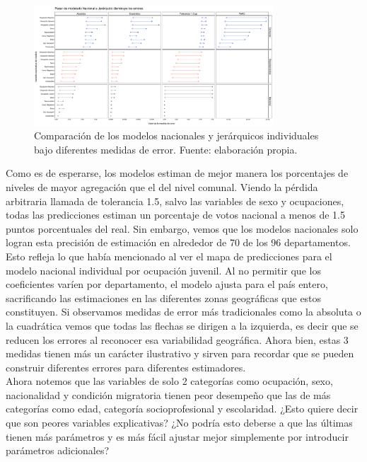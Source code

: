 \begin{figure}[h]
	\centering
	\includegraphics[width = 0.8\textwidth]{Figs/Modelado/Graf_Errores_Modelos_Individuales}
	\caption{Comparación de los modelos nacionales y jerárquicos individuales bajo diferentes medidas de error. Fuente: elaboración propia.}
	\label{fig:Errores_Modelos_Individuales}
\end{figure} 

Como es de esperarse, los modelos estiman de mejor manera los porcentajes de niveles de mayor agregación que el del nivel comunal. Viendo la pérdida arbitraria llamada de tolerancia 1.5, salvo las variables de sexo y ocupaciones, todas las predicciones estiman un porcentaje de votos nacional a menos de 1.5 puntos porcentuales del real. Sin embargo, vemos que los modelos nacionales solo logran esta precisión de estimación en alrededor de 70 de los 96 departamentos.\\ 

Esto refleja lo que había mencionado al ver el mapa de predicciones para el modelo nacional individual por ocupación juvenil. Al no permitir que los coeficientes varíen por departamento, el modelo ajusta para el país entero, sacrificando las estimaciones en las diferentes zonas geográficas que estos constituyen. Si observamos medidas de error más tradicionales como la absoluta o la cuadrática vemos que todas las flechas se dirigen a la izquierda, es decir que se reducen los errores al reconocer esa variabilidad geográfica. Ahora bien, estas 3 medidas tienen más un carácter ilustrativo y sirven para recordar que se pueden construir diferentes errores para diferentes estimadores.\\ 

Ahora notemos que las variables de solo 2 categorías como ocupación, sexo, nacionalidad y condición migratoria tienen peor desempeño que las de más categorías como edad, categoría socioprofesional y escolaridad. ¿Esto quiere decir que son peores variables explicativas? ¿No podría esto deberse a que las últimas tienen más parámetros y es más fácil ajustar mejor simplemente por introducir parámetros adicionales?\\

